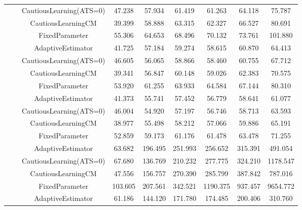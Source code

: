 \begin{table}[!h]
\begin{tabular}[t]{ccccccccc}
 &  & CautiousLearning(ATS=0) & 47.238 & 57.934 & 61.419 & 61.263 & 64.118 & 75.787\\

 &  & CautiousLearningCM & 39.399 & 58.888 & 63.315 & 62.327 & 66.527 & 80.691\\

 & \multirow[t]{-4}{*}{\centering\arraybackslash 1.00} & FixedParameter & 55.306 & 64.653 & 68.496 & 70.132 & 73.761 & 101.880\\
\cmidrule{2-9}
 &  & AdaptiveEstimator & 41.725 & 57.184 & 59.274 & 58.615 & 60.870 & 64.413\\

 &  & CautiousLearning(ATS=0) & 46.605 & 56.065 & 58.866 & 58.460 & 60.755 & 67.712\\

 &  & CautiousLearningCM & 39.341 & 56.847 & 60.148 & 59.026 & 62.383 & 70.575\\

 & \multirow[t]{-4}{*}{\centering\arraybackslash 1.25} & FixedParameter & 53.920 & 61.255 & 63.933 & 64.584 & 67.144 & 80.310\\
\cmidrule{2-9}
 &  & AdaptiveEstimator & 41.373 & 55.741 & 57.452 & 56.779 & 58.641 & 61.077\\

 &  & CautiousLearning(ATS=0) & 46.004 & 54.920 & 57.197 & 56.746 & 58.713 & 63.593\\

 &  & CautiousLearningCM & 38.977 & 55.498 & 58.212 & 57.066 & 59.886 & 65.191\\

\multirow[t]{-28}{*}{\centering\arraybackslash 50} & \multirow[t]{-4}{*}{\centering\arraybackslash 1.50} & FixedParameter & 52.859 & 59.173 & 61.176 & 61.478 & 63.478 & 71.255\\
\cmidrule{1-9}
 &  & AdaptiveEstimator & 63.682 & 196.495 & 251.993 & 256.652 & 315.391 & 491.054\\

 &  & CautiousLearning(ATS=0) & 67.680 & 136.769 & 210.232 & 277.775 & 324.210 & 1178.547\\

 &  & CautiousLearningCM & 47.556 & 156.757 & 270.390 & 285.799 & 387.842 & 787.016\\

 & \multirow[t]{-4}{*}{\centering\arraybackslash 0.25} & FixedParameter & 103.605 & 207.561 & 342.521 & 1190.375 & 937.457 & 9654.772\\
\cmidrule{2-9}
 &  & AdaptiveEstimator & 61.186 & 144.120 & 171.780 & 174.485 & 200.406 & 310.760\\


\end{tabular}
\end{table}
